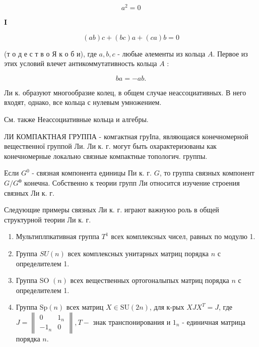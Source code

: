 \documentclass[10pt]{article}
\begin{document}
\[

a^{2}=0

\]



$\mathbf{I}$



\[

(a b) c+(b c) a+(c a) b=0

\]



(т о д е с т в о Я к о б и), где $a, b, c$ - любые әлементы из кольца $A$. Первое из этих условий влечет антикоммутативность кольца $A$ :



\[

b a=-a b .

\]



Ли к. образуют многообразие колец, в общем случае неассоциативных. В него входят, однако, все кольца с нулевым умножением.



См. также Неассоциативные кольца и алгебры.



ЛИ КОМПАКТНАЯ ГРУППА - комгактная груІпа, являющаяся конечномерной вещественної группой Ли. Ли к. г. могут быть охарактеризованы как конечномерные локально связные компактные топологич. группы.



Если $G^{0}$ - связная компонента единицы Пи к. г. $G$, то группа связных компонент $G / G^{\mathbf{0}}$ конечна. Собственно к теории групп Ли относится изучение строения связных Ли к. г.



Следующие примеры связных Ли к. г. играют важнуюо роль в общей структурной теории Ли к. г.



\begin{enumerate}

  \item Мультиплпкативная группа $T^{1}$ всех комплексных чисел, равных по модулю 1.



  \item Группа $S U(n)$ всех комплексных унитарных матриц порядка $n$ с определителем 1.



  \item Группа SO $(n)$ всех вещественных ортогоналыпых матриц порядка $n$ с определителем 1.



  \item Группа $\mathrm{Sp}(n)$ всех матриц $X \in \mathrm{SU}(2 n)$, для к-рых $X J X^{T}=J$, где $J=\left\|\begin{array}{ll}0 & 1_{n} \\ -1_{n} & 0\end{array}\right\|, T-$ знак транспонирования и $1_{n}$ - единичная матрица порядка $n$.



\end{enumerate}
\end{document}
